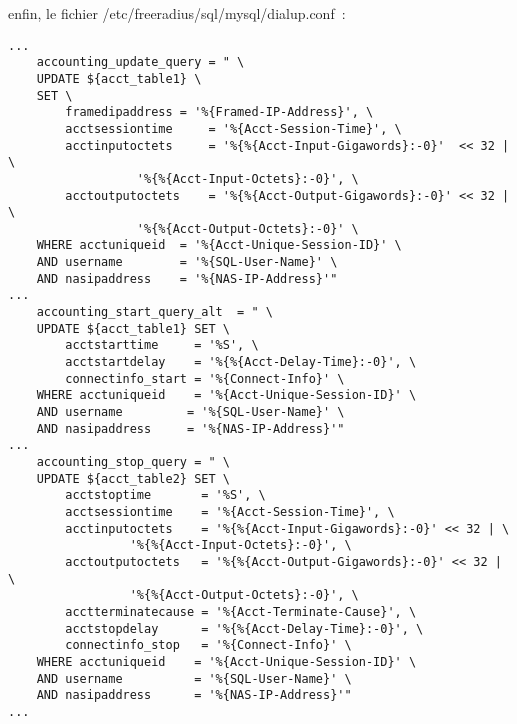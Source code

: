 enfin, le fichier /etc/freeradius/sql/mysql/dialup.conf~:
\begin{lstlisting}
...
	accounting_update_query = " \
	UPDATE ${acct_table1} \
	SET \
	    framedipaddress = '%{Framed-IP-Address}', \
	    acctsessiontime     = '%{Acct-Session-Time}', \
	    acctinputoctets     = '%{%{Acct-Input-Gigawords}:-0}'  << 32 | \
				  '%{%{Acct-Input-Octets}:-0}', \
	    acctoutputoctets    = '%{%{Acct-Output-Gigawords}:-0}' << 32 | \
				  '%{%{Acct-Output-Octets}:-0}' \
	WHERE acctuniqueid  = '%{Acct-Unique-Session-ID}' \
	AND username        = '%{SQL-User-Name}' \
	AND nasipaddress    = '%{NAS-IP-Address}'"
...
	accounting_start_query_alt  = " \
	UPDATE ${acct_table1} SET \
	    acctstarttime     = '%S', \
	    acctstartdelay    = '%{%{Acct-Delay-Time}:-0}', \
	    connectinfo_start = '%{Connect-Info}' \
	WHERE acctuniqueid    = '%{Acct-Unique-Session-ID}' \
	AND username         = '%{SQL-User-Name}' \
	AND nasipaddress     = '%{NAS-IP-Address}'"
...
	accounting_stop_query = " \
	UPDATE ${acct_table2} SET \
	    acctstoptime       = '%S', \
	    acctsessiontime    = '%{Acct-Session-Time}', \
	    acctinputoctets    = '%{%{Acct-Input-Gigawords}:-0}' << 32 | \
				 '%{%{Acct-Input-Octets}:-0}', \
	    acctoutputoctets   = '%{%{Acct-Output-Gigawords}:-0}' << 32 | \
				 '%{%{Acct-Output-Octets}:-0}', \
	    acctterminatecause = '%{Acct-Terminate-Cause}', \
	    acctstopdelay      = '%{%{Acct-Delay-Time}:-0}', \
	    connectinfo_stop   = '%{Connect-Info}' \
	WHERE acctuniqueid    = '%{Acct-Unique-Session-ID}' \
	AND username          = '%{SQL-User-Name}' \
	AND nasipaddress      = '%{NAS-IP-Address}'"
...
\end{lstlisting}



